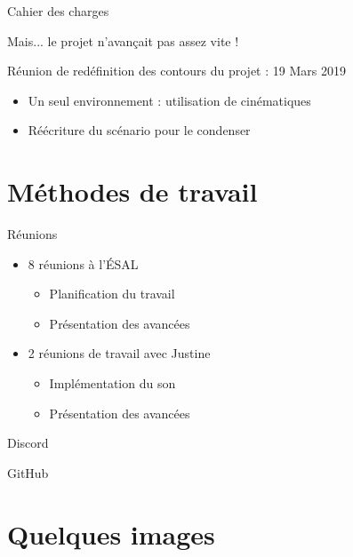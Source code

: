 \documentclass{beamer}
\begin{document}
\begin{frame}{Cahier des charges}

Mais... le projet n'avançait pas assez vite !

\pause
\bigskip
Réunion de redéfinition des contours du projet : 19 Mars 2019

\begin{itemize}
    \item Un seul environnement : utilisation de cinématiques
    \item Réécriture du scénario pour le condenser
\end{itemize}

\end{frame}

\section{Méthodes de travail}

\begin{frame}{Réunions}

\begin{itemize}
    \item 8 réunions à l'ÉSAL
    \begin{itemize}
        \item Planification du travail
        \item Présentation des avancées
    \end{itemize}
    \item 2 réunions de travail avec Justine
    \begin{itemize}
        \item Implémentation du son
        \item Présentation des avancées
    \end{itemize}
\end{itemize}

\end{frame}

\begin{frame}{Discord}
  
\end{frame}

\begin{frame}{GitHub}
  
\end{frame}

\section{Quelques images}
\end{document}
